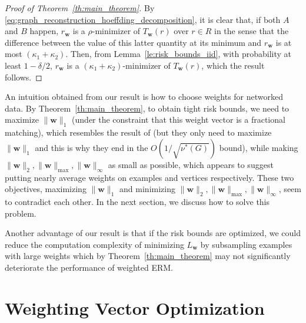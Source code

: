 \documentclass[letterpaper]{article} %
\def\LongVersion{}
\def\LongVersionEnd{}
\newcommand{\weight}{\mathbf{w}}
\newcommand{\empiricalrisk}[1]{L_{#1}}
\newcommand{\normo}[1]{\|#1\|_1}
\newcommand{\red}[1]{\textcolor{red}{#1}}
\newcommand{\todo}[1]{\red{\textsc{todo:} #1}}
\begin{document}
\begin{proof}[Proof of Theorem~\ref{th:main_theorem}]
    By \eqref{eq:graph_reconstruction_hoeffding_decomposition}, it is clear that, if both $A$ and $B$ happen,
    $r_\weight{}$ is a $\rho$-minimizer of $T_\weight{}(r)$ over $r\in R$ in the sense that the difference between the value of this latter quantity at its minimum and $r_\weight{}$ is at most $(\kappa_1+\kappa_2)$.
    Then, from Lemma~\ref{le:risk_bounds_iid}, with probability at least $1-\delta/2$, $r_\weight{}$ is a $(\kappa_1+\kappa_2)$-minimizer of $T_\weight{}(r)$, which the result follows. 
\end{proof}

An intuition obtained from our result is how to choose weights for networked data. By Theorem~\ref{th:main_theorem}, to obtain tight risk bounds, we need to maximize $\normo{\weight{}}$ (under the constraint that this weight vector is a fractional matching), which resembles the result of \cite{wang2017learning} (but they only need to maximize $\normo{\weight{}}$ and this is why they end in the $O(1/\sqrt{\nu^*(G)})$ bound), while making $\|\weight{}\|_2,\|\weight{}\|_\max,\|\weight{}\|_\infty$ as small as possible, which appears to suggest putting nearly average weights on examples and vertices respectively. These two objectives, maximizing $\normo{\weight{}}$ and minimizing $\|\weight{}\|_2,\|\weight{}\|_\max,\|\weight{}\|_\infty$, seem to contradict each other. 
In the next section, we discuss how to solve this problem.  


\LongVersion
Another advantage of our result is that if the risk bounds are optimized, we could reduce the computation complexity of minimizing $\empiricalrisk{\weight{}}$ by subsampling examples with large weights which by Theorem~\ref{th:main_theorem} may not significantly deteriorate the performance of weighted ERM.
\LongVersionEnd

\section{Weighting Vector Optimization} %
\label{sec:weighting_scheme}
\end{document}
